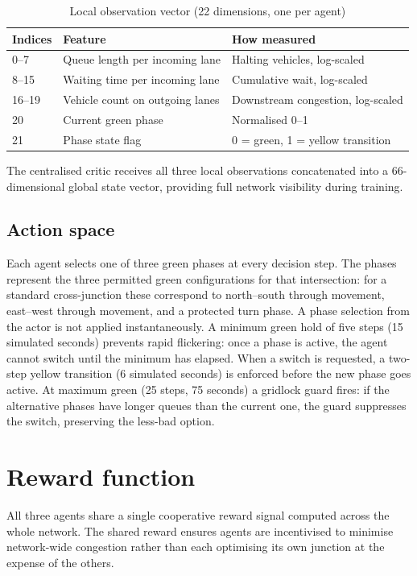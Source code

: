 \documentclass[11pt, a4paper]{report}
\begin{document}
\begin{table}[H]
\centering
\caption{Local observation vector (22 dimensions, one per agent)}
\label{tab:obs_space}
\begin{tabular}{lll}
\toprule
\textbf{Indices} & \textbf{Feature} & \textbf{How measured} \\
\midrule
0--7  & Queue length per incoming lane & Halting vehicles, log-scaled \\
8--15 & Waiting time per incoming lane & Cumulative wait, log-scaled \\
16--19 & Vehicle count on outgoing lanes & Downstream congestion, log-scaled \\
20 & Current green phase & Normalised 0--1 \\
21 & Phase state flag & 0 = green, 1 = yellow transition \\
\bottomrule
\end{tabular}
\end{table}

The centralised critic receives all three local observations concatenated into a 66-dimensional global state vector, providing full network visibility during training.

\subsection{Action space}

Each agent selects one of three green phases at every decision step. The phases represent the three permitted green configurations for that intersection: for a standard cross-junction these correspond to north--south through movement, east--west through movement, and a protected turn phase. A phase selection from the actor is not applied instantaneously. A minimum green hold of five steps (15 simulated seconds) prevents rapid flickering: once a phase is active, the agent cannot switch until the minimum has elapsed. When a switch is requested, a two-step yellow transition (6 simulated seconds) is enforced before the new phase goes active. At maximum green (25 steps, 75 seconds) a gridlock guard fires: if the alternative phases have longer queues than the current one, the guard suppresses the switch, preserving the less-bad option.

\section{Reward function}

All three agents share a single cooperative reward signal computed across the whole network. The shared reward ensures agents are incentivised to minimise network-wide congestion rather than each optimising its own junction at the expense of the others.
\end{document}
